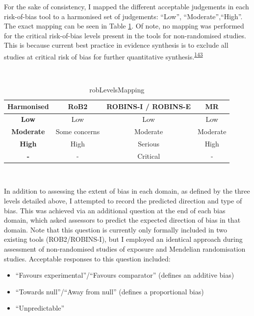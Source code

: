 \documentclass[a4paper, twoside]{templates/ociamthesis}
\providecommand{\tightlist}{%
  \setlength{\itemsep}{0pt}\setlength{\parskip}{0pt}}
\begin{document}
For the sake of consistency, I mapped the different acceptable judgements in each risk-of-bias tool to a harmonised set of judgements: ``Low'', ``Moderate'',``High''. The exact mapping can be seen in Table \ref{tab:robLevelsMapping-table}. Of note, no mapping was performed for the critical risk-of-bias levels present in the tools for non-randomised studies. This is because current best practice in evidence synthesis is to exclude all studies at critical risk of bias for further quantitative synthesis.\textsuperscript{\protect\hyperlink{ref-sterne2016}{143}}

~\\




\begin{table}[H]

\caption[robLevelsMapping]{\label{tab:robLevelsMapping-table}robLevelsMapping}
\centering
\begin{tabular}[t]{>{}cccc}
\toprule
\textbf{Harmonised} & \textbf{RoB2} & \textbf{ROBINS-I / ROBINS-E} & \textbf{MR}\\
\midrule
\textbf{Low} & Low & Low & Low\\
\midrule
\textbf{Moderate} & Some concerns & Moderate & Moderate\\
\midrule
\textbf{High} & High & Serious & High\\
\midrule
\textbf{-} & - & Critical & -\\
\bottomrule
\end{tabular}
\end{table}

~

In addition to assessing the extent of bias in each domain, as defined by the three levels detailed above, I attempted to record the predicted direction and type of bias. This was achieved via an additional question at the end of each bias domain, which asked assessors to predict the expected direction of bias in that domain. Note that this question is currently only formally included in two existing tools (ROB2/ROBINS-I), but I employed an identical approach during assessment of non-randomised studies of exposure and Mendelian randomisation studies. Acceptable responses to this question included:

\begin{itemize}
\tightlist
\item
  ``Favours experimental''/``Favours comparator'' (defines an additive bias)
\item
  ``Towards null''/``Away from null'' (defines a proportional bias)
\item
  ``Unpredictable''
\end{itemize}
\end{document}

